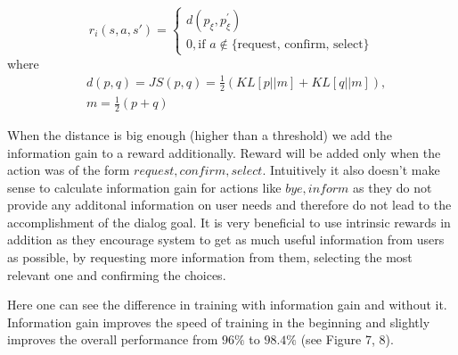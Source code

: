\documentclass[12pt,titlepage,a4paper]{article}
\begin{document}
\begin{equation}
    r_i(s, a, s\prime) =
    \begin{cases}
        d(p_{\xi}, p_{\xi}^\prime) \\
        0, \text{if } a \notin \text{\{request, confirm, select\}}
    \end{cases}
\end{equation}
where
\begin{equation}
    \begin{aligned}
        &d(p, q) = JS(p,q) = \frac{1}{2}(KL[p||m] + KL[q||m]), \\
        &m = \frac{1}{2}(p + q)
    \end{aligned}
\end{equation}

When the distance is big enough (higher than a threshold) we add the information gain to a reward additionally. Reward will be added only when the action was of the form ${request, confirm, select}$. Intuitively it also doesn't make sense to calculate information gain for actions like $bye, inform$ as they do not provide any additonal information on user needs and therefore do not lead to the accomplishment of the dialog goal. It is very beneficial to use intrinsic rewards in addition as they encourage system to get as much useful information from users as possible, by requesting more information from them, selecting the most relevant one and confirming the choices.

Here one can see the difference in training with information gain and without it. Information gain improves the speed of training in the beginning and slightly improves the overall performance from $96\%$  to $98.4\%$ (see Figure 7, 8).
\end{document}
